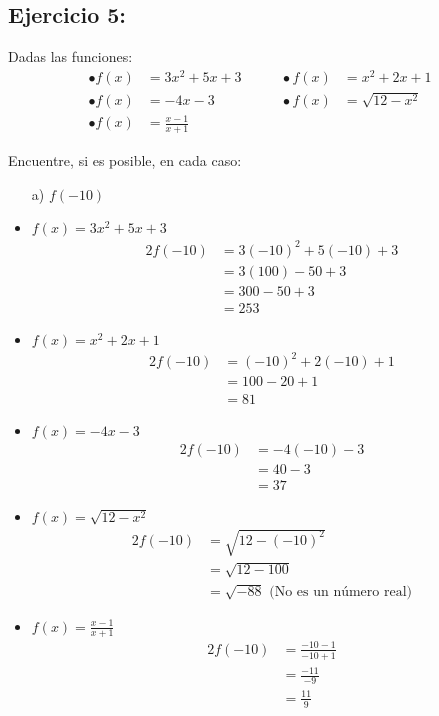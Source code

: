 \documentclass{templateNote}
\begin{document}
\subsection*{\textbf{Ejercicio 5:}}
Dadas las funciones:
\[
\begin{aligned}
    \bullet f(x) &= 3x^2 + 5x + 3 & \quad\quad \bullet f(x) &= x^2 + 2x + 1\\
    \bullet f(x) &= -4x - 3 & \quad\quad \bullet f(x) &= \sqrt{12 - x^2}\\
    \bullet f(x) &= \frac{x-1}{x+1}
\end{aligned}
\]

Encuentre, si es posible, en cada caso:
\begin{itemize}
    \item[a)] $f(-10)$
    \item $f(x) = 3x^2 + 5x + 3$
    \begin{alignat*}{2}
        f(-10) &= 3(-10)^2 + 5(-10) + 3 \\
        &= 3(100) - 50 + 3 \\
        &= 300 - 50 + 3 \\
        &= 253
    \end{alignat*}
    \item $f(x) = x^2 + 2x + 1$
    \begin{alignat*}{2}
        f(-10) &= (-10)^2 + 2(-10) + 1 \\
        &= 100 - 20 + 1 \\
        &= 81
    \end{alignat*}
    \item $f(x) = -4x - 3$
    \begin{alignat*}{2}
        f(-10) &= -4(-10) - 3 \\
        &= 40 - 3 \\
        &= 37
    \end{alignat*}
    \item $f(x) = \sqrt{12 - x^2}$
    \begin{alignat*}{2}
        f(-10) &= \sqrt{12 - (-10)^2} \\
        &= \sqrt{12 - 100} \\
        &= \sqrt{-88} \text{ (No es un número real)}   
    \end{alignat*}
    \item $f(x) = \frac{x-1}{x+1}$
    \begin{alignat*}{2}
        f(-10) &= \frac{-10 - 1}{-10 + 1} \\
        &= \frac{-11}{-9} \\
        &= \frac{11}{9}
    \end{alignat*}
\end{itemize}
\end{document}
